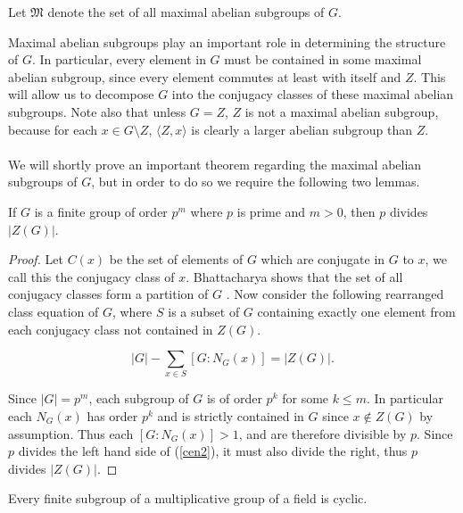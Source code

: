 \begin{definition} Let $\mathfrak{M}$ denote the set of all maximal abelian subgroups of $G$.
\end{definition}
\vspace{3mm}

Maximal abelian subgroups play an important role in determining the structure of $G$. In particular, every element in $G$ must be contained in some maximal abelian subgroup, since every element commutes at least with itself and $Z$. This will allow us to decompose $G$ into the conjugacy classes of these maximal abelian subgroups. Note also that unless $G=Z$, $Z$ is not a maximal abelian subgroup, because for each $x \in G \! \setminus \! Z$, $\langle Z,x \rangle$ is clearly a larger abelian subgroup than $Z$. \\
\\
We will shortly prove an important theorem regarding the maximal abelian subgroups of $G$, but in order to do so we require the following two lemmas. \\

\begin{lemma}\label{primecentre}
If $G$ is a finite group of order $p^m$ where $p$ is prime and $m>0$, then $p$ divides $|Z(G)|$. 
\end{lemma}

\begin{proof}
Let $C(x)$ be the set of elements of $G$ which are conjugate in $G$ to $x$, we call this the conjugacy class of $x$. Bhattacharya shows that the set of all conjugacy classes form a partition of $G$ \cite[p.112]{bhattacharya}. Now consider the following rearranged class equation of $G$, where $S$ is a subset of $G$ containing exactly one element from each conjugacy class not contained in $Z(G)$. 
 
\begin{equation} \label{cen2}
|G| - \sum_{x \in S} [G:N_G(x)] = |Z(G)|.
\end{equation}

Since $|G| = p^m$, each subgroup of $G$ is of order $p^k$ for some $k \leq m$. In particular each $N_G(x)$ has order $p^k$ and is strictly contained in $G$ since $x \not \in Z(G)$ by assumption. Thus each $[G:N_G(x)] > 1$, and are therefore divisible by $p$. Since $p$ divides the left hand side of (\ref{cen2}), it must also divide the right, thus $p$ divides $|Z(G)|$. 

\end{proof}

\begin{lemma}\label{finsubcyc}
Every finite subgroup of a multiplicative group of a field is cyclic.
\end{lemma}


